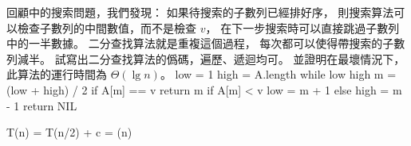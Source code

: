 回顧 中的搜索問題，我們發現：
如果待搜索的子數列已經排好序，
則搜索算法可以檢查子數列的中間數值，而不是檢查 $v$，
在下一步搜索時可以直接跳過子數列中的一半數據。
二分查找算法就是重複這個過程，
每次都可以使得帶搜索的子數列減半。
試寫出二分查找算法的僞碼，遍歷、遞迴均可。
並證明在最壞情況下，此算法的運行時間為 $\Theta(\lg n)$。
\stopEXERCISE
\startANSWER
{}
\startCLRSCODE
low = 1
high = A.length
while low \le high
	m = (low + high) / 2
	if A[m] == v
		return m
	if A[m] < v
		low = m + 1
	else
		high = m - 1
return NIL
\stopCLRSCODE

\startformula
T(n) = T(n/2) + c = \Theta(\lg n)
\stopformula
\stopANSWER
